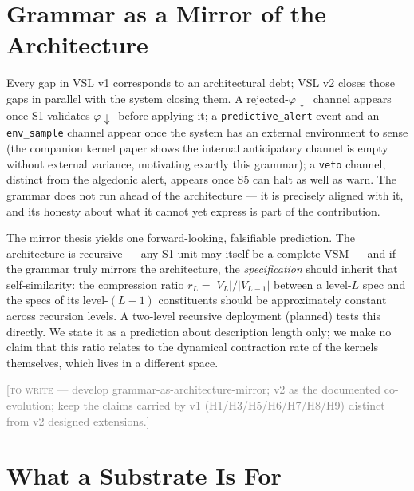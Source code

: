 \documentclass[12pt]{article}
\newcommand{\phidown}{\ensuremath{\varphi\!\downarrow}}
\newcommand{\TODO}[1]{\medskip\noindent\textcolor{gray}{\small[\textsc{to write} --- #1]}\medskip}
\begin{document}
\section{Grammar as a Mirror of the Architecture}
\label{sec:mirror}

Every gap in VSL v1 corresponds to an architectural debt; VSL v2 closes those gaps in
parallel with the system closing them. A rejected-\phidown\ channel appears once S1
validates \phidown\ before applying it; a \texttt{predictive\_alert} event and an
\texttt{env\_sample} channel appear once the system has an external environment to sense
(the companion kernel paper shows the internal anticipatory channel is empty without
external variance, motivating exactly this grammar); a \texttt{veto} channel, distinct
from the algedonic alert, appears once S5 can halt as well as warn. The grammar does not
run ahead of the architecture --- it is precisely aligned with it, and its honesty about
what it cannot yet express is part of the contribution.

The mirror thesis yields one forward-looking, falsifiable prediction. The
architecture is recursive --- any S1 unit may itself be a complete VSM ---
and if the grammar truly mirrors the architecture, the \emph{specification}
should inherit that self-similarity: the compression ratio
$r_L = |V_L|/|V_{L-1}|$ between a level-$L$ spec and the specs of its
level-$(L\!-\!1)$ constituents should be approximately constant across
recursion levels. A two-level recursive deployment (planned) tests this
directly. We state it as a prediction about description length only; we
make no claim that this ratio relates to the dynamical contraction rate of
the kernels themselves, which lives in a different space.

\TODO{develop grammar-as-architecture-mirror; v2 as the documented co-evolution; keep
the claims carried by v1 (H1/H3/H5/H6/H7/H8/H9) distinct from v2 designed extensions.}

\section{What a Substrate Is For}
\label{sec:closing}

\end{document}
